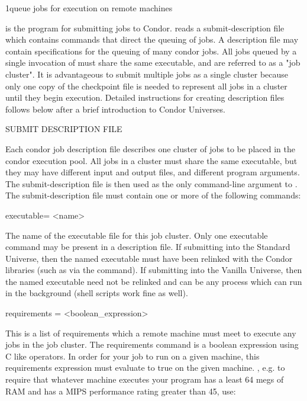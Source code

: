 \begin{ManPage}{}{1}{queue jobs for execution on remote machines}
\label{man-condor-submit}
\Synopsis {}

\Description
{} is the program for submitting jobs to Condor.  reads a submit-description file which contains
commands that direct the queuing of jobs. A description file may contain specifications for the queuing of many condor jobs.
All jobs queued by a single invocation of  must share the same executable, and are referred to as a "job
cluster". It is advantageous to submit multiple jobs as a single cluster because only one copy of the checkpoint file is
needed to represent all jobs in a cluster until they begin execution. Detailed instructions for creating description files follows
below after a brief introduction to Condor Universes. 

SUBMIT DESCRIPTION FILE 

Each condor job description file describes one cluster of jobs to be placed in the condor execution pool. All jobs in a cluster
must share the same executable, but they may have different input and output files, and different program arguments. The
submit-description file is then used as the only command-line argument to . The submit-description file must
contain one or more of the following commands: 

executable= <name> 

The name of the executable file for this job cluster. Only one executable command may be present in a description file. If
submitting into the Standard Universe, then the named executable must have been relinked with the Condor libraries (such
as via the  command). If submitting into the Vanilla Universe, then the named executable need not be
relinked and can be any process which can run in the background (shell scripts work fine as well). 

requirements = <boolean\_expression> 

This is a list of requirements which a remote machine must meet to execute any jobs in the job cluster. The requirements
command is a boolean expression using C like operators. In order for your job to run on a given machine, this requirements
expression must evaluate to true on the given machine. , e.g. to require that whatever machine executes your program has
a least 64 megs of RAM and has a MIPS performance rating greater than 45, use: 


\end{ManPage}
